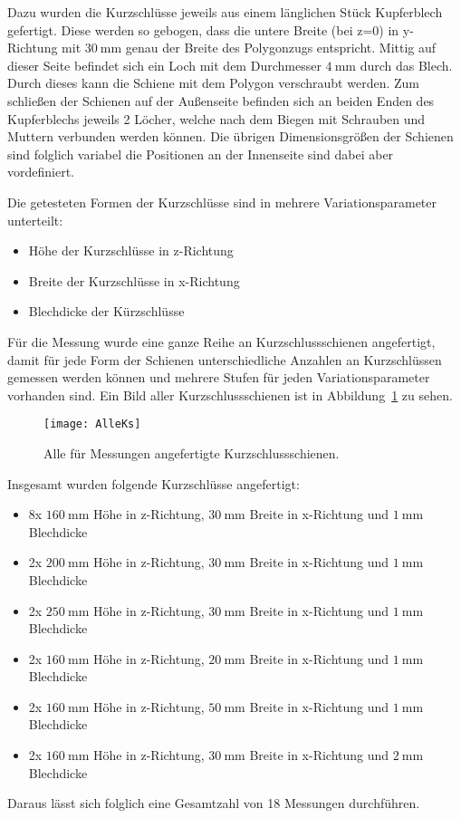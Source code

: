 Dazu wurden die Kurzschl\"usse jeweils aus einem l\"anglichen St\"uck Kupferblech gefertigt. Diese werden so gebogen, dass die untere Breite (bei z=0) in y-Richtung mit $\SI{30}{\milli\meter}$ genau der Breite des Polygonzugs entspricht. Mittig auf dieser Seite befindet sich ein Loch mit dem Durchmesser $\SI{4}{\milli\meter}$ durch das Blech. Durch dieses kann die Schiene mit dem Polygon verschraubt werden. Zum schlie\ss{}en der Schienen auf der Au\ss{}enseite befinden sich an beiden Enden des Kupferblechs jeweils 2 L\"ocher, welche nach dem Biegen mit Schrauben und Muttern verbunden werden k\"onnen. Die \"ubrigen Dimensionsgr\"o\ss{}en der Schienen sind folglich variabel die Positionen an der Innenseite sind dabei aber vordefiniert.
\par
Die getesteten Formen der Kurzschl\"usse sind in mehrere Variationsparameter unterteilt:
\begin{itemize}
	\item H\"ohe der Kurzschl\"usse in z-Richtung
	\item Breite der Kurzschl\"usse in x-Richtung
	\item Blechdicke der K\"urzschl\"usse
\end{itemize}
\par
F\"ur die Messung wurde eine ganze Reihe an Kurzschlussschienen angefertigt, damit f\"ur jede Form der Schienen unterschiedliche Anzahlen an Kurzschl\"ussen gemessen werden k\"onnen und mehrere Stufen f\"ur jeden Variationsparameter vorhanden sind. Ein Bild aller Kurzschlussschienen ist in Abbildung~\ref{fig:AlleKs} zu sehen.
\par
\begin{figure}[htb]
	\centering
	\texttt{[image: AlleKs]}
	\caption{Alle f\"ur Messungen angefertigte Kurzschlussschienen.}
	\label{fig:AlleKs}
\end{figure}
Insgesamt wurden folgende Kurzschl\"usse angefertigt:
\par
\begin{itemize}
	\item 8x $\SI{160}{\milli\meter}$ H\"ohe in z-Richtung, $\SI{30}{\milli\meter}$ Breite in x-Richtung und $\SI{1}{\milli\meter}$ Blechdicke
	\item 2x $\SI{200}{\milli\meter}$ H\"ohe in z-Richtung, $\SI{30}{\milli\meter}$ Breite in x-Richtung und $\SI{1}{\milli\meter}$ Blechdicke
	\item 2x $\SI{250}{\milli\meter}$ H\"ohe in z-Richtung, $\SI{30}{\milli\meter}$ Breite in x-Richtung und $\SI{1}{\milli\meter}$ Blechdicke
	\item 2x $\SI{160}{\milli\meter}$ H\"ohe in z-Richtung, $\SI{20}{\milli\meter}$ Breite in x-Richtung und $\SI{1}{\milli\meter}$ Blechdicke
	\item 2x $\SI{160}{\milli\meter}$ H\"ohe in z-Richtung, $\SI{50}{\milli\meter}$ Breite in x-Richtung und $\SI{1}{\milli\meter}$ Blechdicke
	\item 2x $\SI{160}{\milli\meter}$ H\"ohe in z-Richtung, $\SI{30}{\milli\meter}$ Breite in x-Richtung und $\SI{2}{\milli\meter}$ Blechdicke
\end{itemize}
Daraus l\"asst sich folglich eine Gesamtzahl von 18 Messungen durchf\"uhren. 


